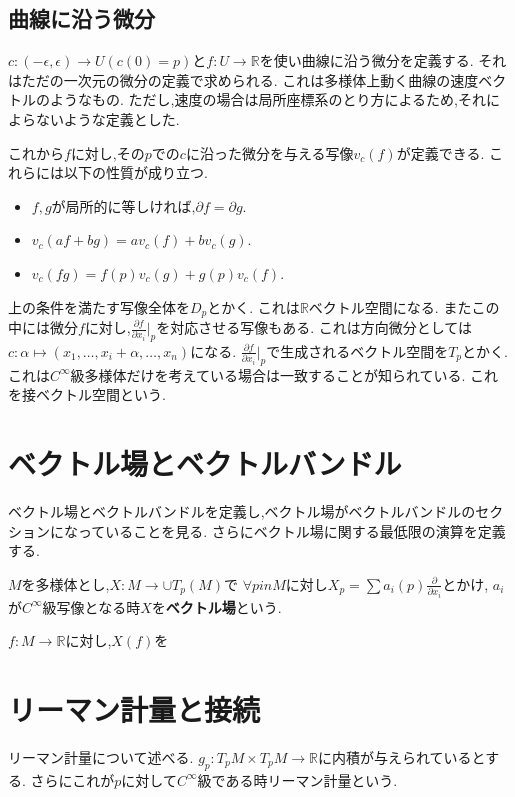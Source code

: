 \documentclass[dvipdfmx]{ujarticle}
\begin{document}
\subsection{曲線に沿う微分}
$c: (- \epsilon , \epsilon) \to U(c(0)=p)$と$f:U \to \mathbb{R}$を使い曲線に沿う微分を定義する.
それはただの一次元の微分の定義で求められる.
これは多様体上動く曲線の速度ベクトルのようなもの.
ただし,速度の場合は局所座標系のとり方によるため,それによらないような定義とした.

これから$f$に対し,その$p$での$c$に沿った微分を与える写像$v_c(f)$が定義できる.
これらには以下の性質が成り立つ.
\begin{itemize}
  \item $f,g$が局所的に等しければ,$\partial f = \partial g$.
  \item $v_c(af + bg)= av_c(f) + bv_c(g)$.
  \item $v_c(fg) = f(p)v_c(g) + g(p)v_c(f)$.
\end{itemize}

上の条件を満たす写像全体を$D_p$とかく.
これは$\mathbb{R}$ベクトル空間になる.
またこの中には微分$f$に対し,$\frac{\partial f}{\partial x_i}|_p$を対応させる写像もある.
これは方向微分としては$c: \alpha  \mapsto (x_1, \ldots, x_i + \alpha, \ldots, x_n)$になる.
$\frac{\partial f}{\partial x_i}|_p$で生成されるベクトル空間を$T_p$とかく.
これは$C^{\infty}$級多様体だけを考えている場合は一致することが知られている.
これを接ベクトル空間という.

\section{ベクトル場とベクトルバンドル}
ベクトル場とベクトルバンドルを定義し,ベクトル場がベクトルバンドルのセクションになっていることを見る.
さらにベクトル場に関する最低限の演算を定義する.

\begin{screen}
\begin{dfn}
$M$を多様体とし,$X:M \to \cup T_p(M)$で
$\forall p in M$に対し$X_p = \sum a_i(p) \frac{\partial}{\partial x_i}$とかけ,
$a_i$が$C^{\infty}$級写像となる時$X$を\textbf{ベクトル場}という.
\end{dfn}
\end{screen}

$f:M \to \mathbb{R}$に対し,$X(f)$を

\section{リーマン計量と接続}
リーマン計量について述べる.
$g_p: T_pM \times T_pM \to \mathbb{R}$に内積が与えられているとする.
さらにこれが$p$に対して$C^{\infty}$級である時リーマン計量という.
\end{document}
